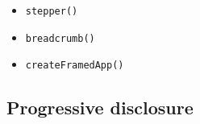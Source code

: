 \begin{itemize}
  \begin{itemize}
  \tightlist
  \item
    \texttt{s\allowbreak{}t\allowbreak{}e\allowbreak{}p\allowbreak{}p\allowbreak{}e\allowbreak{}r\allowbreak{}(\allowbreak{})}
  \item
    \texttt{b\allowbreak{}r\allowbreak{}e\allowbreak{}a\allowbreak{}d\allowbreak{}c\allowbreak{}r\allowbreak{}u\allowbreak{}m\allowbreak{}b\allowbreak{}(\allowbreak{})}
  \item
    \texttt{c\allowbreak{}r\allowbreak{}e\allowbreak{}a\allowbreak{}t\allowbreak{}e\allowbreak{}F\allowbreak{}r\allowbreak{}a\allowbreak{}m\allowbreak{}e\allowbreak{}d\allowbreak{}A\allowbreak{}p\allowbreak{}p\allowbreak{}(\allowbreak{})}
  \end{itemize}
\end{itemize}

\subsection{Progressive disclosure}\label{record-019-progressive-disclosure}

